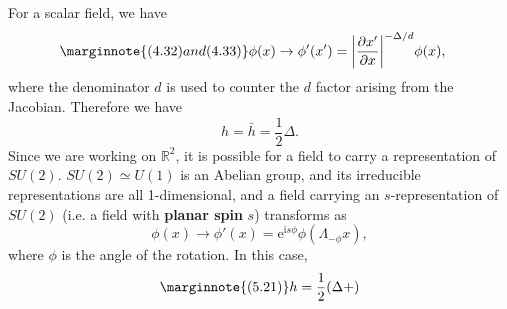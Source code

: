\documentclass[hyperref, a4paper]{article}
\newcommand*{\ii}{\mathrm{i}}
\newcommand*{\ee}{\mathrm{e}}
\newcommand*{\concept}[1]{{\textbf{#1}}}
\begin{document}
For a scalar field, we have 
\begin{equation} \marginnote{(4.32) and (4.33)}
    \phi(x) \to \phi'(x') = \abs{\pdv{x'}{x}}^{- \Delta / d} \phi(x), \quad 
\end{equation}
where the denominator $d$ is used to counter the $d$ factor arising from the Jacobian. Therefore we have 
\begin{equation}
    h = \bar{h} = \frac{1}{2} \Delta.
\end{equation}
Since we are working on $\mathbb{R}^2$, it is possible for a field to carry a representation of $SU(2)$.
$SU(2) \simeq U(1)$ is an Abelian group, and its irreducible representations are all 1-dimensional, and 
a field carrying an $s$-representation of $SU(2)$ (i.e. a field with \concept{planar spin} $s$) transforms as 
\begin{equation}
    \phi(x) \to \phi'(x) = \ee^{\ii s \phi} \phi(\Lambda_{- \phi} x) ,
\end{equation}
where $\phi$ is the angle of the rotation. In this case, 
\begin{equation} \marginnote{(5.21)}
    h = \frac{1}{2} (\Delta + )
\end{equation}



\end{document}
